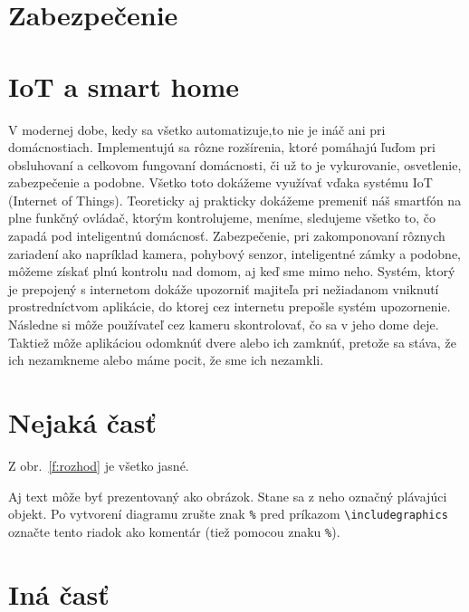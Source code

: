 \documentclass[10pt,twoside,slovak,a4paper]{article}
\begin{document}
\section{Zabezpečenie}\label{zabezpečenie}

\section{IoT a smart home}

V modernej dobe, kedy sa všetko automatizuje,to nie je ináč ani pri domácnostiach. Implementujú sa rôzne rozšírenia, ktoré pomáhajú ľuďom pri obsluhovaní a celkovom fungovaní domácnosti, či už to je vykurovanie, osvetlenie, zabezpečenie a podobne. Všetko toto dokážeme využívať vďaka systému IoT (Internet of Things). Teoreticky aj prakticky dokážeme premeniť náš smartfón na plne funkčný ovládač, ktorým kontrolujeme, meníme, sledujeme všetko to, čo zapadá pod inteligentnú domácnosť.  Zabezpečenie, pri zakomponovaní rôznych zariadení ako napríklad kamera, pohybový senzor, inteligentné zámky a podobne, môžeme získať plnú kontrolu nad domom, aj keď sme mimo neho. Systém, ktorý je prepojený s internetom dokáže upozorniť majiteľa pri nežiadanom vniknutí prostredníctvom aplikácie, do ktorej cez internetu prepošle systém upozornenie. Následne si môže používateľ cez kameru skontrolovať, čo sa v jeho dome deje. Taktiež môže aplikáciou odomknúť dvere alebo ich zamknúť, pretože sa stáva, že ich nezamkneme alebo máme pocit, že sme ich nezamkli.


\section{Nejaká časť} \label{nejaka}

Z obr.~\ref{f:rozhod} je všetko jasné. 

\begin{figure*}[tbh]
\centering
Aj text môže byť prezentovaný ako obrázok. Stane sa z neho označný plávajúci objekt. Po vytvorení diagramu zrušte znak \texttt{\%} pred príkazom \verb|\includegraphics| označte tento riadok ako komentár (tiež pomocou znaku \texttt{\%}).
\caption{Rozhodujúci argument.}
\label{f:rozhod}
\end{figure*}



\section{Iná časť} \label{ina}
\end{document}

